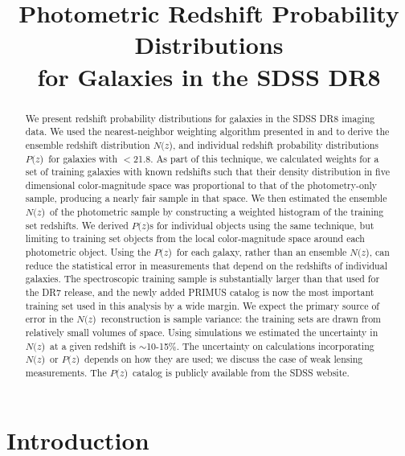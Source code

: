 \documentclass[preprint]{aastex}
\newcommand{\localbias}{10-15\%}
\newcommand{\rmax}{21.8}
\newcommand{\pofz}{$P(z$)}
\newcommand{\nofz}{$N(z$)}
\begin{document}
\title{Photometric Redshift Probability Distributions \\for Galaxies in the SDSS DR8}



\begin{abstract}


We present redshift probability distributions for galaxies in the SDSS DR8
imaging data.  We used the nearest-neighbor weighting algorithm presented in
\citet{LimaPhotoz08} and \citet{CunhaPhotoz09} to derive the ensemble redshift
distribution \nofz, and individual redshift probability distributions \pofz\
for galaxies with \rmag$ < $\rmax.  As part of this technique, we calculated
weights for a set of training galaxies with known redshifts such that their
density distribution in five dimensional color-magnitude space was proportional
to that of the photometry-only sample, producing a nearly fair sample in that
space.  We then estimated the ensemble \nofz\ of the photometric sample by
constructing a weighted histogram of the training set redshifts.  We derived
\pofz s for individual objects using the same technique, but limiting to
training set objects from the local color-magnitude space around each
photometric object.  Using the \pofz\ for each galaxy, rather than an ensemble
\nofz, can reduce the statistical error in measurements that depend on the
redshifts of individual galaxies. The spectroscopic training sample is
substantially larger than that used for the DR7 release, and the newly added
PRIMUS catalog is now the most important training set used in this analysis by
a wide margin.  We expect the primary source of error in the \nofz\
reconstruction is sample variance: the training sets are drawn from relatively
small volumes of space.  Using simulations we estimated the uncertainty in
\nofz\ at a given redshift is $\sim$\localbias.  The uncertainty on
calculations incorporating \nofz\ or \pofz\ depends on how they are used; we
discuss the case of weak lensing measurements.  The \pofz\ catalog is publicly
available from the SDSS website.  

\end{abstract}

\section{Introduction} \label{sec:intro}
\end{document}
